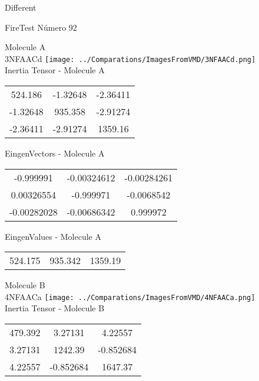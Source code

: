 \begin{center}
\vtab
\vtab
\textcolor{NavyBlue}{\Large Different}
\end{center}

 \newpage

\vtab[-2cm]
\begin{center}
{\large FireTest \tab Número 92}
\end{center}
\begin{multicols}{2}
\begin{center}

Molecule A \\ 
3NFAACd
\texttt{[image: ../Comparations/ImagesFromVMD/3NFAACd.png]}
\\
Inertia Tensor - Molecule A \\
\vtab

\begin{tabular}{|c c c|}
524.186	 & 	-1.32648	 & 	-2.36411	 \\
-1.32648	 & 	935.358	 & 	-2.91274	 \\
-2.36411	 & 	-2.91274	 & 	1359.16
\end{tabular}

\vtab
 EingenVectors - Molecule A     \\
\vtab
\begin{tabular}{|c c c|}
-0.999991	 & 	-0.00324612	 & 	-0.00284261	 \\
0.00326554	 & 	-0.999971	 & 	-0.0068542	 \\
-0.00282028	 & 	-0.00686342	 & 	0.999972
\end{tabular}

\vtab
 EingenValues - Molecule A     \\
\vtab
\begin{tabular}{|c c c|}
524.175	 & 	935.342	 & 	1359.19	 \\
\end{tabular}
\columnbreak

Molecule B \\ 
4NFAACa
\texttt{[image: ../Comparations/ImagesFromVMD/4NFAACa.png]}
\\
Inertia Tensor - Molecule B \\
\vtab

\begin{tabular}{|c c c|}
479.392	 & 	3.27131	 & 	4.22557	 \\
3.27131	 & 	1242.39	 & 	-0.852684	 \\
4.22557	 & 	-0.852684	 & 	1647.37
\end{tabular}


\end{center}
\end{multicols}

